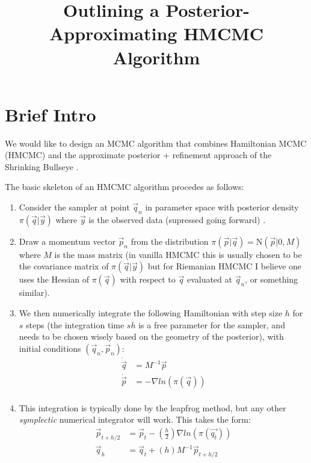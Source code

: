 \documentclass[12pt,a4paper]{article}
\title{Outlining a Posterior-Approximating HMCMC Algorithm}
\begin{document}
\maketitle
\section{Brief Intro}
We would like to design an MCMC algorithm that combines Hamiltonian MCMC (HMCMC) \parencite{neal_mcmc_2012,betancourt_geometric_2014,betancourt_conceptual_2017} and the approximate posterior + refinement approach of the Shrinking Bullseye \parencite{conrad_accelerating_2015}. 

The basic skeleton of an HMCMC algorithm procedes as follows:
\begin{enumerate}
\item Consider the sampler at point $\vec{q}_n$ in parameter space with posterior density $\pi(\vec{q} | \vec{y})$ where $\vec{y}$ is the observed data (supressed going forward) .
\item Draw a momentum vector $\vec{p}_n$ from the distribution $\pi(\vec{p} | \vec{q} ) = \text{N}(\vec{p} |0, M)$ where $M$ is the mass matrix (in vanilla HMCMC this is usually chosen to be the covariance matrix of $\pi(\vec{q}|\vec{y})$ but for Riemanian HMCMC I believe one uses the Hessian of $\pi(\vec{q})$ with respect to $\vec{q}$ evaluated at $\vec{q}_n$, or something similar).
\item We then numerically integrate the following Hamiltonian with step size $h$ for $s$ steps (the integration time $sh$ is a free parameter for the sampler, and needs to be chosen wisely based on the geometry of the posterior), with initial conditions $(\vec{q}_n, \vec{p}_n)$:
\begin{equation}
\begin{split}
\dot{\vec{q}} &= M^{-1} \vec{p} \\ 
\dot{\vec{p}} &= - \nabla ln(\pi(\vec{q}))\\
\end{split}
\end{equation}
\item This integration is typically done by the leapfrog method, but any other \textit{symplectic} numerical integrator will work.  This takes the form:
\begin{equation}
\begin{split}
\vec{p}_{t+h/2} &= \vec{p}_t - (\frac{h}{2})  \nabla ln(\pi(\vec{q_t}))\\
\vec{q}_h &= \vec{q}_t + (h)M^{-1} \vec{p}_{t+h/2} \\ 

\end{split}
\end{equation}
\end{enumerate}
\end{document}

